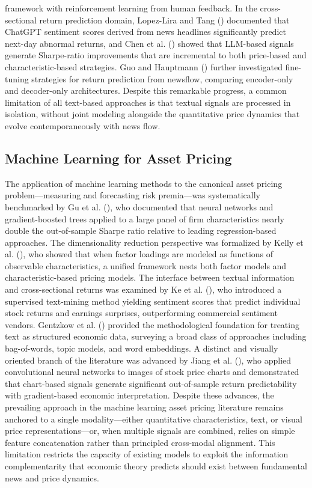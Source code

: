 \documentclass[
  11pt,
  a4paper,
]{article}
\begin{document}
framework with reinforcement learning from human feedback. In the
cross-sectional return prediction domain, Lopez-Lira and Tang
() documented that ChatGPT
sentiment scores derived from news headlines significantly predict
next-day abnormal returns, and Chen et al.
() showed that LLM-based signals
generate Sharpe-ratio improvements that are incremental to both
price-based and characteristic-based strategies. Guo and Hauptmann
() further investigated fine-tuning
strategies for return prediction from newsflow, comparing encoder-only
and decoder-only architectures. Despite this remarkable progress, a
common limitation of all text-based approaches is that textual signals
are processed in isolation, without joint modeling alongside the
quantitative price dynamics that evolve contemporaneously with news
flow.

\subsection{Machine Learning for Asset
Pricing}\label{machine-learning-for-asset-pricing}

The application of machine learning methods to the canonical asset
pricing problem---measuring and forecasting risk premia---was
systematically benchmarked by Gu et al. (),
who documented that neural networks and gradient-boosted trees applied
to a large panel of firm characteristics nearly double the out-of-sample
Sharpe ratio relative to leading regression-based approaches. The
dimensionality reduction perspective was formalized by Kelly et al.
(), who showed that when factor loadings
are modeled as functions of observable characteristics, a unified
framework nests both factor models and characteristic-based pricing
models. The interface between textual information and cross-sectional
returns was examined by Ke et al. (),
who introduced a supervised text-mining method yielding sentiment scores
that predict individual stock returns and earnings surprises,
outperforming commercial sentiment vendors. Gentzkow et al.
() provided the methodological
foundation for treating text as structured economic data, surveying a
broad class of approaches including bag-of-words, topic models, and word
embeddings. A distinct and visually oriented branch of the literature
was advanced by Jiang et al. (), who
applied convolutional neural networks to images of stock price charts
and demonstrated that chart-based signals generate significant
out-of-sample return predictability with gradient-based economic
interpretation. Despite these advances, the prevailing approach in the
machine learning asset pricing literature remains anchored to a single
modality---either quantitative characteristics, text, or visual price
representations---or, when multiple signals are combined, relies on
simple feature concatenation rather than principled cross-modal
alignment. This limitation restricts the capacity of existing models to
exploit the information complementarity that economic theory predicts
should exist between fundamental news and price dynamics.
\end{document}
